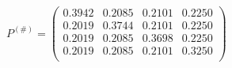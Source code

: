 \documentclass{standalone}
\begin{document}
	$P^{(\#)} = 
	\begin{pmatrix} 
		0.3942  & 0.2085 & 0.2101 & 0.2250  \\
		0.2019  & 0.3744 & 0.2101 & 0.2250 \\
		0.2019  & 0.2085 & 0.3698 & 0.2250 \\
		0.2019  & 0.2085 & 0.2101 & 0.3250 \\
	\end{pmatrix}$
\end{document}
